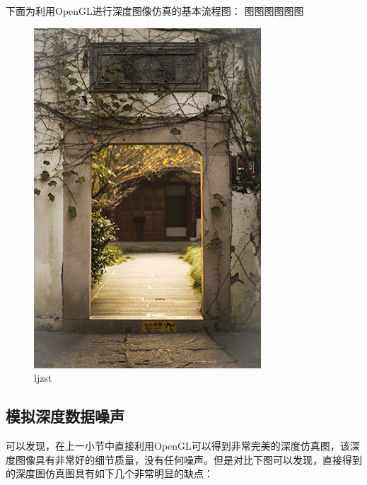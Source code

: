 下面为利用OpenGL进行深度图像仿真的基本流程图：
图图图图图图
\begin{figure}[htb]
	\centering 
	\includegraphics[scale=1.0]{./Pictures/test.jpg} 
	\caption{ljzst} 
\end{figure}





\subsection{模拟深度数据噪声} %
可以发现，在上一小节中直接利用OpenGL可以得到非常完美的深度仿真图，该深度图像具有非常好的细节质量，没有任何噪声。但是对比下图可以发现，直接得到的深度图仿真图具有如下几个非常明显的缺点：

